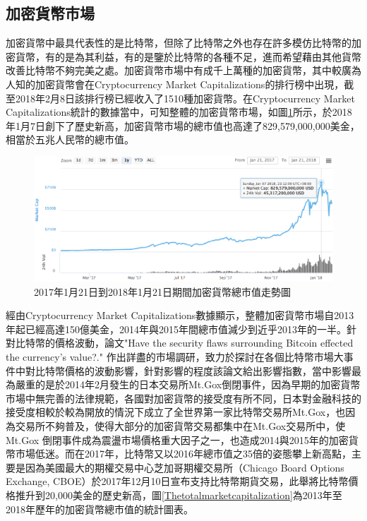 		\subsection{加密貨幣市場}

		加密貨幣中最具代表性的是比特幣，但除了比特幣之外也存在許多模仿比特幣的加密貨幣，有的是為其利益，有的是鑒於比特幣的各種不足，進而希望藉由其他貨幣改善⽐特幣不夠完美之處。加密貨幣市場中有成千上萬種的加密貨幣，其中較廣為人知的加密貨幣會在Cryptocurrency Market Capitalizations\supercite{CryptocurrencyMarketCapitalizations}的排行榜中出現，截至2018年2月8日該排行榜已經收入了1510種加密貨幣。在Cryptocurrency Market Capitalizations統計的數據當中，可知整體的加密貨幣市場，如圖\ref{TotalMarketCapitalization}所示，於2018年1月7日創下了歷史新高，加密貨幣市場的總市值也高達了829,579,000,000美金，相當於五兆人民幣的總市值。

		\begin{figure}[!htbp]
			\centering
			\includegraphics[width = 1\textwidth]{TotalMarketCapitalization.png}
			\caption{2017年1月21日到2018年1月21日期間加密貨幣總市值走勢圖\supercite{CryptocurrencyMarketCapitalizations}}\label{TotalMarketCapitalization}
		\end{figure}

		經由Cryptocurrency Market Capitalizations數據顯示，整體加密貨幣市場自2013年起已經高達150億美金，2014年與2015年間總市值減少到近乎2013年的一半。針對比特幣的價格波動，論文"Have the security flaws surrounding Bitcoin effected the currency's value?."
		\supercite{HavethesecurityflawssurroundingBITCOINeffectedthecurrencysvalue?}
		作出詳盡的市場調研，致力於探討在各個比特幣市場大事件中對比特幣價格的波動影響，針對影響的程度該論文給出影響指數，當中影響最為嚴重的是於2014年2月發生的日本交易所Mt.Gox倒閉事件，因為早期的加密貨幣市場中無完善的法律規範，各國對加密貨幣的接受度有所不同，日本對金融科技的接受度相較於較為開放的情況下成立了全世界第一家比特幣交易所Mt.Gox，也因為交易所不夠普及，使得大部分的加密貨幣交易都集中在Mt.Gox交易所中，使Mt.Gox 倒閉事件成為震盪市場價格重⼤因⼦之⼀，也造成2014與2015年的加密貨幣市場低迷。而在2017年，比特幣又以2016年總市值之35倍的姿態攀上新高點，主要是因為美國最大的期權交易中心芝加哥期權交易所（Chicago Board Options Exchange, CBOE）於2017年12月10日宣布支持比特幣期貨交易，此舉將比特幣價格推升到20,000美金的歷史新高，圖\ref{Thetotalmarketcapitalization}為2013年至2018年歷年的加密貨幣總市值的統計圖表。

